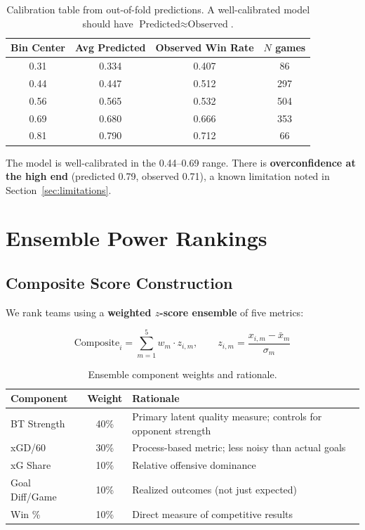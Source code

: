 \documentclass[11pt, a4paper]{article}
\begin{document}
\begin{table}[H]
\centering
\caption{Calibration table from out-of-fold predictions. A well-calibrated model should have $\text{Predicted} \approx \text{Observed}$.}
\label{tab:calibration}
\begin{tabular}{cccc}
\toprule
\textbf{Bin Center} & \textbf{Avg Predicted} & \textbf{Observed Win Rate} & \textbf{$N$ games} \\
\midrule
0.31 & 0.334 & 0.407 & 86 \\
0.44 & 0.447 & 0.512 & 297 \\
0.56 & 0.565 & 0.532 & 504 \\
0.69 & 0.680 & 0.666 & 353 \\
0.81 & 0.790 & 0.712 & 66 \\
\bottomrule
\end{tabular}
\end{table}

\noindent The model is well-calibrated in the 0.44--0.69 range. There is \textbf{overconfidence at the high end} (predicted 0.79, observed 0.71), a known limitation noted in Section~\ref{sec:limitations}.

\section{Ensemble Power Rankings}
\label{sec:rankings}

\subsection{Composite Score Construction}

We rank teams using a \textbf{weighted $z$-score ensemble} of five metrics:

\begin{equation}
\text{Composite}_i = \sum_{m=1}^{5} w_m \cdot z_{i,m}, \qquad
z_{i,m} = \frac{x_{i,m} - \bar{x}_m}{\sigma_m}
\label{eq:composite}
\end{equation}

\begin{table}[H]
\centering
\caption{Ensemble component weights and rationale.}
\label{tab:weights}
\begin{tabular}{lcl}
\toprule
\textbf{Component} & \textbf{Weight} & \textbf{Rationale} \\
\midrule
BT Strength & 40\% & Primary latent quality measure; controls for opponent strength \\
xGD/60 & 30\% & Process-based metric; less noisy than actual goals \\
xG Share & 10\% & Relative offensive dominance \\
Goal Diff/Game & 10\% & Realized outcomes (not just expected) \\
Win \% & 10\% & Direct measure of competitive results \\
\bottomrule
\end{tabular}
\end{table}
\end{document}
